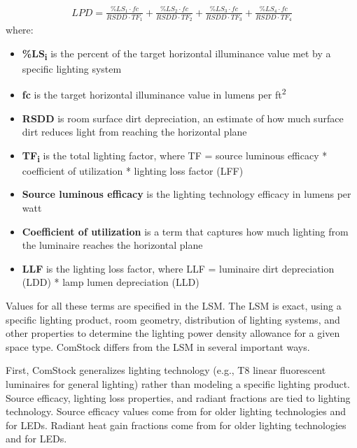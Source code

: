 \begin{align}
\label{lsm_lpd_eqn}
LPD = \frac{\% LS_{1} \cdot fc}{RSDD \cdot TF_{1}} + \frac{\% LS_{2} \cdot fc}{RSDD \cdot TF_{2}} + \frac{\% LS_{3} \cdot fc}{RSDD \cdot TF_{3}} + \frac{\% LS_{4} \cdot fc}{RSDD \cdot TF_{4}}
\end{align}
where:\\
\begin{itemize}
\item \textbf{\%LS\textsubscript{i}} is the percent of the target horizontal illuminance value met by a specific lighting system\\
\item \textbf{fc} is the target horizontal illuminance value in lumens per ft\textsuperscript{2}\\
\item \textbf{RSDD} is room surface dirt depreciation, an estimate of how much surface dirt reduces light from reaching the horizontal plane\\
\item \textbf{TF\textsubscript{i}} is the total lighting factor, where TF = source luminous efficacy * coefficient of utilization * lighting loss factor (LFF)\\
\item \textbf{Source luminous efficacy} is the lighting technology efficacy in lumens per watt\\
\item \textbf{Coefficient of utilization} is a term that captures how much lighting from the luminaire reaches the horizontal plane\\
\item \textbf{LLF} is the lighting loss factor, where LLF  = luminaire dirt depreciation (LDD) * lamp lumen depreciation (LLD)\\
\end{itemize}

Values for all these terms are specified in the LSM.  The LSM is exact, using a specific lighting product, room geometry, distribution of lighting systems, and other properties to determine the lighting power density allowance for a given space type. ComStock differs from the LSM in several important ways. 

First, ComStock generalizes lighting technology (e.g., T8 linear fluorescent luminaires for general lighting) rather than modeling a specific lighting product.  Source efficacy, lighting loss properties, and radiant fractions are tied to lighting technology. Source efficacy values come from \cite{doe2015lmc} for older lighting technologies and \cite{doe2019ssl} for LEDs.  Radiant heat gain fractions come from \cite{ashrae_rp1282} for older lighting technologies and \cite{ashrae_rp1681} for LEDs.

